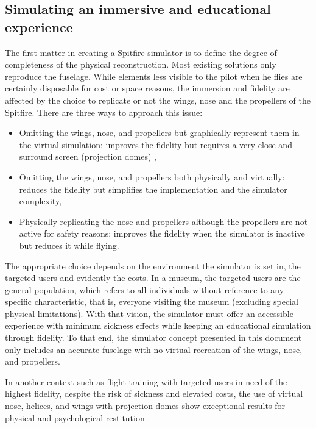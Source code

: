 \documentclass[authoryear,preprint]{sigplanconf}
\begin{document}
\subsection{Simulating an immersive and educational experience}

The first matter in creating a Spitfire simulator is to define the degree of completeness of the physical reconstruction. Most existing solutions only reproduce the fuselage. While elements less visible to the pilot when he flies are certainly disposable for cost or space reasons, the immersion and fidelity are affected by the choice to replicate or not the wings, nose and the propellers of the Spitfire. There are three ways to approach this issue:
\begin{itemize}
    \item Omitting the wings, nose, and propellers but graphically represent them in the virtual simulation: improves the fidelity but requires a very close and surround screen (projection domes) \cite{ProjectionDome},
    \item Omitting the wings, nose, and propellers both physically and virtually: reduces the fidelity but simplifies the implementation and the simulator complexity,
    \item Physically replicating the nose and propellers although the propellers are not active for safety reasons: improves the fidelity when the simulator is inactive but reduces it while flying.
\end{itemize}

The appropriate choice depends on the environment the simulator is set in, the targeted users and evidently the costs. In a museum, the targeted users are the general population, which refers to all individuals without reference to any specific characteristic, that is, everyone visiting the museum (excluding special physical limitations).  With that vision, the simulator must offer an accessible experience with minimum sickness effects while keeping an educational simulation through fidelity. To that end, the simulator concept presented in this document only includes an accurate fuselage with no virtual recreation of the wings, nose, and propellers.

In another context such as flight training with targeted users in need of the highest fidelity, despite the risk of sickness and elevated costs, the use of virtual nose, helices, and wings with projection domes show exceptional results for physical and psychological restitution \cite{Boultbee}.
\end{document}

